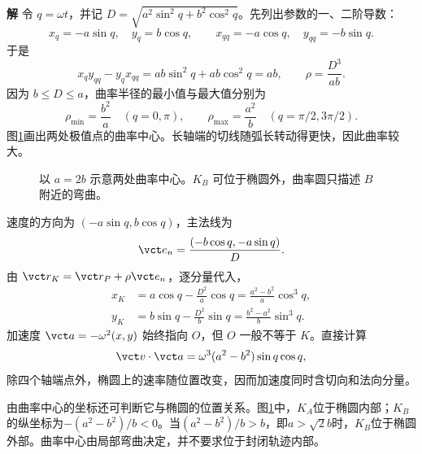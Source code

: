 \documentclass[11pt,openany,fontset=fandol]{ctexbook}
\theoremstyle{definition}\newtheorem{example}{例}[chapter]\newtheorem{exercise}{习题}[chapter]
\newcommand{\SolutionStart}{\par\medskip\ifdim\pagetotal>0pt\ifdim\dimexpr\pagegoal-\pagetotal\relax<3\baselineskip\newpage\fi\fi\noindent\textbf{解}\quad\ignorespaces}
\newenvironment{solution}{\SolutionStart}{\par\medskip}
\begin{document}
\begin{solution}
令 $q=\omega t$，并记 $D=\sqrt{a^2\sin^2q+b^2\cos^2q}$。先列出参数的一、二阶导数：
\[
x_q=-a\sin q,\quad y_q=b\cos q,\qquad
x_{qq}=-a\cos q,\quad y_{qq}=-b\sin q.
\]
于是
\[
x_qy_{qq}-y_qx_{qq}=ab\sin^2q+ab\cos^2q=ab,
\qquad \rho=\frac{D^3}{ab}.
\]
因为 $b\le D\le a$，曲率半径的最小值与最大值分别为
\[
\rho_{\min}=\frac{b^2}{a}\quad(q=0,\pi),\qquad
\rho_{\max}=\frac{a^2}{b}\quad(q=\pi/2,3\pi/2).
\]
图\ref{mp3:fig:l3-p1-s}画出两处极值点的曲率中心。长轴端的切线随弧长转动得更快，因此曲率较大。

\begin{figure}[H]\centering
{}
\caption{以 $a=2b$ 示意两处曲率中心。$K_B$ 可位于椭圆外，曲率圆只描述 $B$ 附近的弯曲。}\label{mp3:fig:l3-p1-s}
\end{figure}


速度的方向为 $(-a\sin q,b\cos q)$，主法线为
\[
\vct e_n=\frac{(-b\cos q,-a\sin q)}D.
\]
由 $\vct r_K=\vct r_P+\rho\vct e_n$，逐分量代入，
\[
\begin{aligned}
x_K&=a\cos q-\frac{D^2}{a}\cos q
=\frac{a^2-b^2}{a}\cos^3q,\\
y_K&=b\sin q-\frac{D^2}{b}\sin q
=\frac{b^2-a^2}{b}\sin^3q.
\end{aligned}
\]
加速度 $\vct a=-\omega^2(x,y)$ 始终指向 $O$，但 $O$ 一般不等于 $K$。直接计算
\[
\vct v\cdot\vct a
=\omega^3(a^2-b^2)\sin q\cos q,
\]
除四个轴端点外，椭圆上的速率随位置改变，因而加速度同时含切向和法向分量。

由曲率中心的坐标还可判断它与椭圆的位置关系。图\ref{mp3:fig:l3-p1-s}中，$K_A$位于椭圆内部；$K_B$的纵坐标为$-(a^2-b^2)/b<0$。当$(a^2-b^2)/b>b$，即$a>\sqrt2b$时，$K_B$位于椭圆外部。曲率中心由局部弯曲决定，并不要求位于封闭轨迹内部。
\end{solution}
\end{document}
